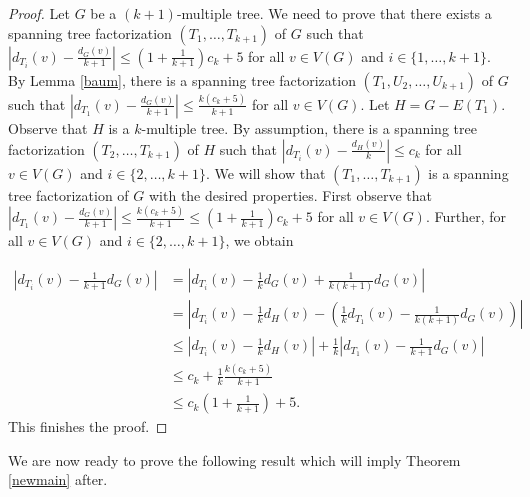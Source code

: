 \documentclass{article}
\theoremstyle{plain}
\theoremstyle{nonumberplain}
\theoremstyle{nonumberplain}
\newcommand{\stf}{spanning tree factorization }
\begin{document}
\begin{proof}
Let $G$ be a $(k+1)$-multiple tree. We need to prove that there exists a \stf $(T_1,\ldots,T_{k+1})$ of $G$ such that $|d_{T_i}(v)-\frac{d_G(v)}{k+1}|\leq (1+\frac{1}{k+1})c_k+5$ for all $v \in V(G)$ and $i \in \{1,\ldots,k+1\}$. By Lemma \ref{baum}, there is a \stf $(T_1,U_2,\ldots,U_{k+1})$ of $G$ such that $|d_{T_1}(v)-\frac{d_G(v)}{k+1}|\leq \frac{k(c_k+5)}{k+1}$ for all $v \in V(G)$. Let $H=G-E(T_1)$. Observe that $H$ is a $k$-multiple tree. By assumption, there is a spanning tree factorization $(T_2,\ldots,T_{k+1})$ of $H$ such that $|d_{T_i}(v)-\frac{d_H(v)}{k}|\leq c_k$ for all $v \in V(G)$ and $i \in \{2,\ldots,k+1\}$. We will show that $(T_1,\ldots,T_{k+1})$ is a \stf of $G$ with the desired properties. First observe that $|d_{T_1}(v)-\frac{d_G(v)}{k+1}|\leq \frac{k(c_k+5)}{k+1}\leq (1+\frac{1}{k+1})c_k+5$ for all $v \in V(G)$. Further, for all $v \in V(G)$ and $i \in \{2,\ldots,k+1\}$, we obtain

\begin{align*}
|d_{T_i}(v)-\frac{1}{k+1}d_G(v)|&=|d_{T_i}(v)-\frac{1}{k}d_G(v)+\frac{1}{k(k+1)}d_G(v)|\\
&=|d_{T_i}(v)-\frac{1}{k}d_H(v)-(\frac{1}{k}d_{T_1}(v)-\frac{1}{k(k+1)}d_G(v))|\\
&\leq |d_{T_i}(v)-\frac{1}{k}d_H(v)|+\frac{1}{k}|d_{T_1}(v)-\frac{1}{k+1}d_G(v)|\\
&\leq c_k+\frac{1}{k}\frac{k(c_k+5)}{k+1}\\
&\leq c_k(1+\frac{1}{k+1})+5.
\end{align*}
This finishes the proof.
\end{proof}

We are now ready to prove the following result which will imply Theorem \ref{newmain} after.
\end{document}
